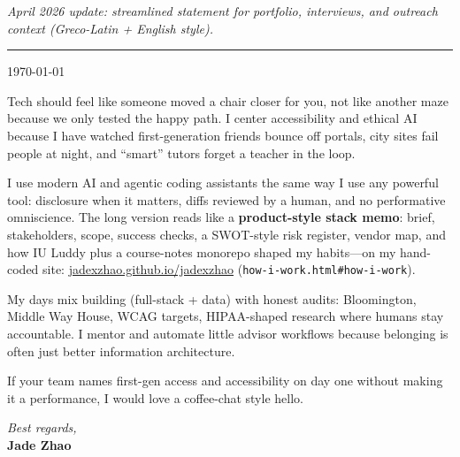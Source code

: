 \documentclass[11pt]{article}
\begin{document}

\vspace{0.35em}
\noindent\textit{April 2026 update: streamlined statement for portfolio, interviews, and outreach context (Greco-Latin + English style).}

\vspace{0.5em}
\noindent\rule{\linewidth}{1pt}
\vspace{0.75em}

\noindent\today

\vspace{0.75em}

Tech should feel like someone moved a chair closer for you, not like another maze because we only tested the happy path. I center accessibility and ethical AI because I have watched first-generation friends bounce off portals, city sites fail people at night, and ``smart'' tutors forget a teacher in the loop.

I use modern AI and agentic coding assistants the same way I use any powerful tool: disclosure when it matters, diffs reviewed by a human, and no performative omniscience. The long version reads like a \textbf{product-style stack memo}: brief, stakeholders, scope, success checks, a SWOT-style risk register, vendor map, and how IU Luddy plus a course-notes monorepo shaped my habits---on my hand-coded site: \href{https://jadexzhao.github.io/jadexzhao/how-i-work.html\#how-i-work}{jadexzhao.github.io/jadexzhao} (\texttt{how-i-work.html\#how-i-work}).

My days mix building (full-stack + data) with honest audits: Bloomington, Middle Way House, WCAG targets, HIPAA-shaped research where humans stay accountable. I mentor and automate little advisor workflows because belonging is often just better information architecture.

If your team names first-gen access and accessibility on day one without making it a performance, I would love a coffee-chat style hello.

\vspace{1.5em}
\noindent\textit{Best regards,}\\
\textbf{Jade Zhao}
\end{document}
